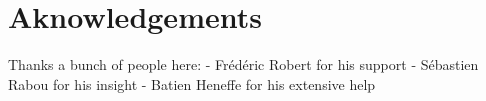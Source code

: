 \chapter*{Aknowledgements}

Thanks a bunch of people here:
- Frédéric Robert for his support
- Sébastien Rabou for his insight
- Batien Heneffe for his extensive help